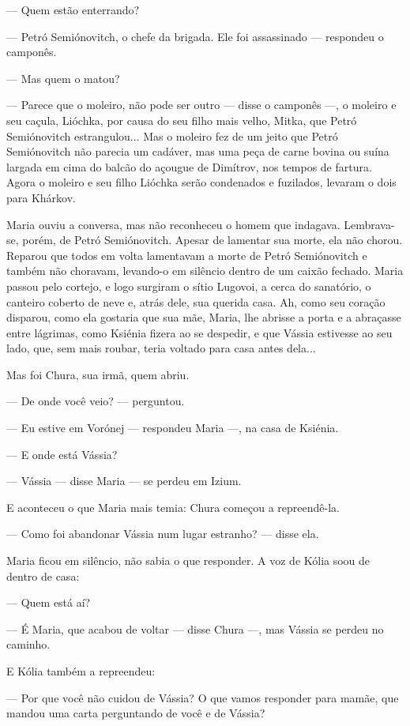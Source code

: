 --- Quem estão enterrando?

--- Petró Semiónovitch, o chefe da brigada. Ele foi assassinado ---
respondeu o camponês.

--- Mas quem o matou?

--- Parece que o moleiro, não pode ser outro --- disse o camponês ---, o
moleiro e seu caçula, Lióchka, por causa do seu filho mais velho, Mitka,
que Petró Semiónovitch estrangulou... Mas o moleiro fez de um jeito que
Petró Semiónovitch não parecia um cadáver, mas uma peça de carne bovina
ou suína largada em cima do balcão do açougue de Dimítrov, nos tempos de
fartura. Agora o moleiro e seu filho Lióchka serão condenados e
fuzilados, levaram o dois para Khárkov.

Maria ouviu a conversa, mas não reconheceu o homem que indagava.
Lembrava-se, porém, de Petró Semiónovitch. Apesar de lamentar sua morte,
ela não chorou. Reparou que todos em volta lamentavam a morte de Petró
Semiónovitch e também não choravam, levando-o em silêncio dentro de um
caixão fechado. Maria passou pelo cortejo, e logo surgiram o sítio
Lugovoi, a cerca do sanatório, o canteiro coberto de neve e, atrás dele,
sua querida casa. Ah, como seu coração disparou, como ela gostaria que
sua mãe, Maria, lhe abrisse a porta e a abraçasse entre lágrimas, como
Ksiénia fizera ao se despedir, e que Vássia estivesse ao seu lado, que,
sem mais roubar, teria voltado para casa antes dela...

Mas foi Chura, sua irmã, quem abriu.

--- De onde você veio? --- perguntou.

--- Eu estive em Vorónej --- respondeu Maria ---, na casa de Ksiénia.

--- E onde está Vássia?

--- Vássia --- disse Maria --- se perdeu em Izium.

E aconteceu o que Maria mais temia: Chura começou a repreendê-la.

--- Como foi abandonar Vássia num lugar estranho? --- disse ela.

Maria ficou em silêncio, não sabia o que responder. A voz de Kólia soou
de dentro de casa:

--- Quem está aí?

--- É Maria, que acabou de voltar --- disse Chura ---, mas Vássia se
perdeu no caminho.

E Kólia também a repreendeu:

--- Por que você não cuidou de Vássia? O que vamos responder para mamãe,
que mandou uma carta perguntando de você e de Vássia?

